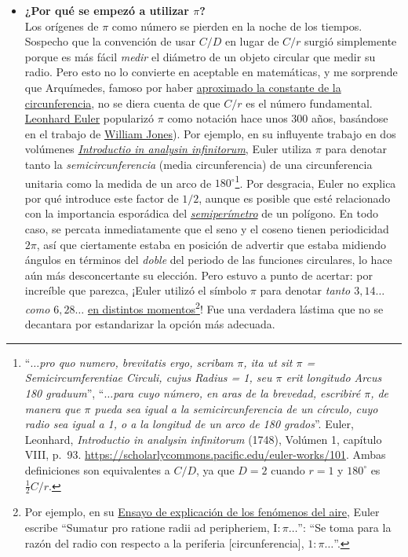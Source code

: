 \begin{itemize}
  \item \textbf{¿Por qué se empezó a utilizar $\pi$?} \\ Los orígenes de $\pi$ como número se pierden en la noche de los tiempos. Sospecho que la convención de usar $C/D$ en lugar de $C/r$ surgió simplemente porque es más fácil \emph{medir} el diámetro de un objeto circular que medir su radio. Pero esto no lo convierte en aceptable en matemáticas, y me sorprende que Arquímedes, famoso por haber \href{http://itech.fgcu.edu/faculty/clindsey/mhf4404/archimedes/archimedes.html}{aproximado la constante de la circunferencia}, no se diera cuenta de que $C/r$ es el número fundamental. \href{https://es.wikipedia.org/wiki/Leonhard_Euler}{Leonhard Euler} popularizó $\pi$ como notación hace unos 300 años, basándose en el trabajo de \href{https://es.wikipedia.org/wiki/William_Jones_(matemático)}{William Jones}). Por ejemplo, en su influyente trabajo en dos volúmenes \href{https://es.wikipedia.org/wiki/Introductio_in_analysin_infinitorum}{\emph{Introductio in analysin infinitorum}}, Euler utiliza $\pi$ para denotar tanto la \emph{semicircunferencia} (media circunferencia) de una circunferencia unitaria como la medida de un arco de $180^\circ$\footnote{``\emph{$\ldots$pro quo numero, brevitatis ergo, scribam $\pi$, ita ut sit $\pi$ = Semicircumferentiae Circuli, cujus Radius = 1, seu $\pi$ erit longitudo Arcus 180 graduum}'', ``\emph{$\ldots$para cuyo número, en aras de la brevedad, escribiré $\pi$, de manera que $\pi$ pueda sea igual a la semicircunferencia de un círculo, cuyo radio sea igual a 1, o a la longitud de un arco de 180 grados}''. Euler, Leonhard, \emph{Introductio in analysin infinitorum} (1748), Volúmen 1, capítulo VIII, p.~93. \href{https://scholarlycommons.pacific.edu/euler-works/101}{https://scholarlycommons.pacific.edu/euler-works/101}. Ambas definiciones son equivalentes a $C/D$, ya que $D=2$ cuando $r=1$ y $180^\circ$ es $\frac{1}{2}C/r$.}. Por desgracia, Euler no explica por qué introduce este factor de $1/2$, aunque es posible que esté relacionado con la importancia esporádica del \href{https://es.wikipedia.org/wiki/Semiper%C3%ADmetro}{\emph{semiperímetro}} de un polígono. En todo caso, se percata inmediatamente que el seno y el coseno tienen periodicidad $2\pi$, así que ciertamente estaba en posición de advertir que estaba midiendo ángulos en términos del \emph{doble} del periodo de las funciones circulares, lo hace aún más desconcertante su elección. Pero estuvo a punto de acertar: por increíble que parezca, ¡Euler utilizó el símbolo $\pi$ para denotar \emph{tanto $3,14\ldots$ como $6,28\ldots$} \href{https://en.wikipedia.org/wiki/Pi#Adoption_of_the_symbol_%CF%80}{en distintos momentos}\footnote{Por ejemplo, en su \href{http://eulerarchive.maa.org/docs/originals/E007.pdf#page=5}{Ensayo de explicación de los fenómenos del aire}, Euler escribe ``Sumatur pro ratione radii ad peripheriem, $\mathrm{I} : \pi\ldots$'': ``Se toma para la razón del radio con respecto a la periferia [circunferencia], $1: \pi\ldots$''.}! Fue una verdadera lástima que no se decantara por estandarizar la opción más adecuada.


\end{itemize}
